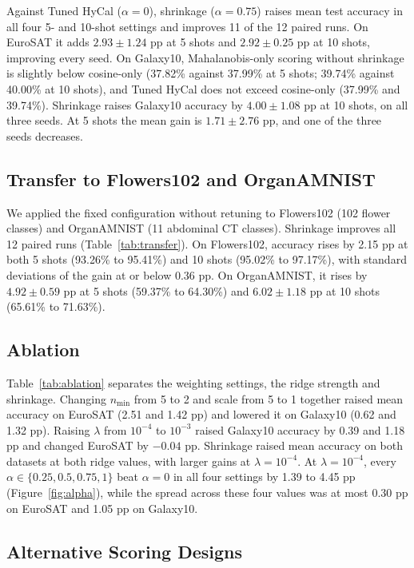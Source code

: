 \documentclass[letterpaper]{article} %
\newcommand{\nmin}{n_{\min}}
\begin{document}
Against Tuned HyCal ($\alpha = 0$), shrinkage ($\alpha = 0.75$) raises mean test accuracy in all four 5- and 10-shot settings and improves 11 of the 12 paired runs. On EuroSAT it adds $2.93 \pm 1.24$ pp at 5 shots and $2.92 \pm 0.25$ pp at 10 shots, improving every seed. On Galaxy10, Mahalanobis-only scoring without shrinkage is slightly below cosine-only (37.82\% against 37.99\% at 5 shots; 39.74\% against 40.00\% at 10 shots), and Tuned HyCal does not exceed cosine-only (37.99\% and 39.74\%). Shrinkage raises Galaxy10 accuracy by $4.00 \pm 1.08$ pp at 10 shots, on all three seeds. At 5 shots the mean gain is $1.71 \pm 2.76$ pp, and one of the three seeds decreases.

\subsection{Transfer to Flowers102 and OrganAMNIST}

We applied the fixed configuration without retuning to Flowers102 (102 flower classes) and OrganAMNIST (11 abdominal CT classes). Shrinkage improves all 12 paired runs (Table~\ref{tab:transfer}). On Flowers102, accuracy rises by 2.15 pp at both 5 shots (93.26\% to 95.41\%) and 10 shots (95.02\% to 97.17\%), with standard deviations of the gain at or below 0.36 pp. On OrganAMNIST, it rises by $4.92 \pm 0.59$ pp at 5 shots (59.37\% to 64.30\%) and $6.02 \pm 1.18$ pp at 10 shots (65.61\% to 71.63\%).

\subsection{Ablation}

Table~\ref{tab:ablation} separates the weighting settings, the ridge strength and shrinkage. Changing $\nmin$ from 5 to 2 and scale from 5 to 1 together raised mean accuracy on EuroSAT (2.51 and 1.42 pp) and lowered it on Galaxy10 (0.62 and 1.32 pp). Raising $\lambda$ from $10^{-4}$ to $10^{-3}$ raised Galaxy10 accuracy by 0.39 and 1.18 pp and changed EuroSAT by $-0.04$ pp. Shrinkage raised mean accuracy on both datasets at both ridge values, with larger gains at $\lambda = 10^{-4}$. At $\lambda = 10^{-4}$, every $\alpha \in \{0.25, 0.5, 0.75, 1\}$ beat $\alpha = 0$ in all four settings by 1.39 to 4.45 pp (Figure~\ref{fig:alpha}), while the spread across these four values was at most 0.30 pp on EuroSAT and 1.05 pp on Galaxy10.

\subsection{Alternative Scoring Designs}
\end{document}
